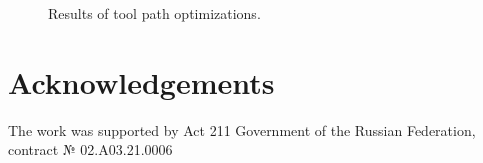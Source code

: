 \documentclass{../download/tPRS2e}
\begin{document}
\begin{figure}
\begin{center}
\caption{Results of tool path optimizations.}
\end{center}
\end{figure}

\section*{Acknowledgements}

The work was supported by Act 211 Government of the Russian Federation, contract № 02.A03.21.0006


\nocite{*}

\end{document}
